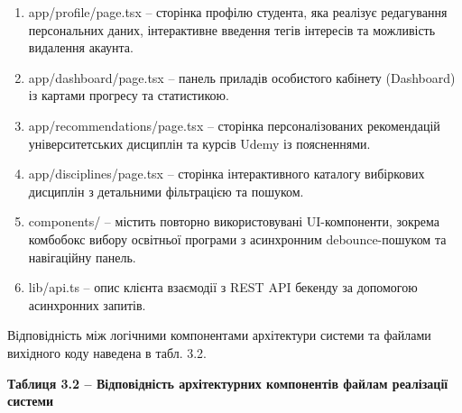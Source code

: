 \documentclass[
]{article}
\begin{document}
\begin{enumerate}
\item
  app/profile/page.tsx -- сторінка профілю студента, яка реалізує
  редагування персональних даних, інтерактивне введення тегів інтересів
  та можливість видалення акаунта.
\item
  app/dashboard/page.tsx -- панель приладів особистого кабінету
  (Dashboard) із картами прогресу та статистикою.
\item
  app/recommendations/page.tsx -- сторінка персоналізованих рекомендацій
  університетських дисциплін та курсів Udemy із поясненнями.
\item
  app/disciplines/page.tsx -- сторінка інтерактивного каталогу
  вибіркових дисциплін з детальними фільтрацією та пошуком.
\item
  components/ -- містить повторно використовувані UI-компоненти, зокрема
  комбобокс вибору освітньої програми з асинхронним debounce-пошуком та
  навігаційну панель.
\item
  lib/api.ts -- опис клієнта взаємодії з REST API бекенду за допомогою
  асинхронних запитів.
\end{enumerate}

Відповідність між логічними компонентами архітектури системи та файлами
вихідного коду наведена в табл. 3.2.

\textbf{Таблиця 3.2 -- Відповідність архітектурних компонентів файлам
реалізації системи}
\end{document}
